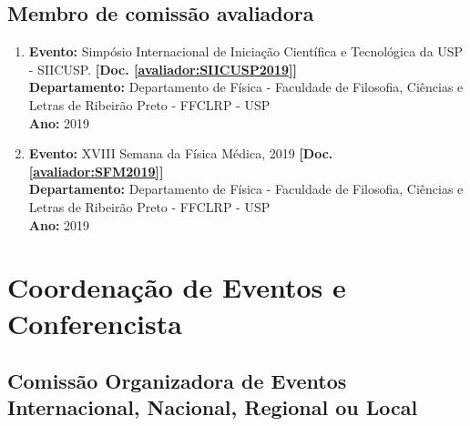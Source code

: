 \documentclass[a4paper,oneside,10pt]{article}
\begin{document}

\subsection{Membro de comissão avaliadora}
\vspace{0.3cm}

\begin{enumerate}
\renewcommand{\labelenumi}{{\large\bfseries\arabic{enumi}.}}

\item \textbf{Evento:} Simpósio Internacional de Iniciação Científica e Tecnológica da USP - SIICUSP. \textbf{[Doc. \ref{avaliador:SIICUSP2019}]}\\
      \textbf{Departamento:} Departamento de Física - Faculdade de Filosofia, Ciências e Letras de Ribeirão Preto - FFCLRP - USP\\
      \textbf{Ano:} 2019\\

\item \textbf{Evento:} XVIII Semana da Física Médica, 2019 \textbf{[Doc. \ref{avaliador:SFM2019}]}\\
      \textbf{Departamento:} Departamento de Física - Faculdade de Filosofia, Ciências e Letras de Ribeirão Preto - FFCLRP - USP\\
      \textbf{Ano:} 2019\\

\end{enumerate}

\section{Coordenação de Eventos e Conferencista}
\vspace{0.3cm}


\subsection{Comiss\~{a}o Organizadora de Eventos Internacional, Nacional, Regional ou Local}
\vspace{0.3cm}
\end{document}

